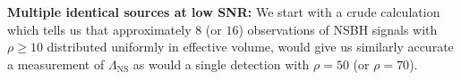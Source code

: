 \documentclass[aps,prd,amsmath,floats,floatfix, twocolumn,
superscriptaddress,nofootinbib,showpacs]{revtex4-1}
\newcommand{\lambdans}{\Lambda_\mathrm{NS}}
\begin{document}
% 
% 




\textbf{Multiple identical sources at low SNR: }\label{s2:identical_multiple}
% 
We start with a crude calculation which tells us that approximately $8$ (or $16$) 
observations
of NSBH signals with $\rho\geq 10$ distributed uniformly in effective volume, would
give us similarly accurate a measurement of $\lambdans$ as would a single detection
with $\rho=50$ (or $\rho=70$). 
\end{document}
